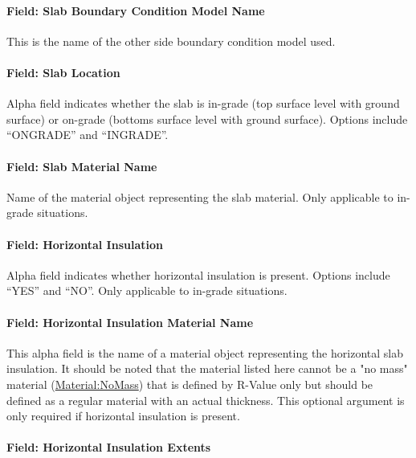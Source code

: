 \paragraph{Field: Slab Boundary Condition Model Name}\label{field-slab-boundary-condition-model-name}

This is the name of the other side boundary condition model used.

\paragraph{Field: Slab Location}\label{field-slab-location}

Alpha field indicates whether the slab is in-grade (top surface level with ground surface) or on-grade (bottoms surface level with ground surface). Options include ``ONGRADE'' and ``INGRADE''.

\paragraph{Field: Slab Material Name}\label{field-slab-material-name}

Name of the material object representing the slab material. Only applicable to in-grade situations.

\paragraph{Field: Horizontal Insulation}\label{field-horizontal-insulation}

Alpha field indicates whether horizontal insulation is present. Options include ``YES'' and ``NO''. Only applicable to in-grade situations.

\paragraph{Field: Horizontal Insulation Material Name}\label{field-horizontal-insulation-material-name}

This alpha field is the name of a material object representing the horizontal slab insulation. It should be noted that the material listed here cannot be a "no mass" material (\hyperref[materialnomass]{Material:NoMass}) that is defined by R-Value only but should be defined as a regular material with an actual thickness. This optional argument is only required if horizontal insulation is present.

\paragraph{Field: Horizontal Insulation Extents}\label{field-horizontal-insulation-extents}

